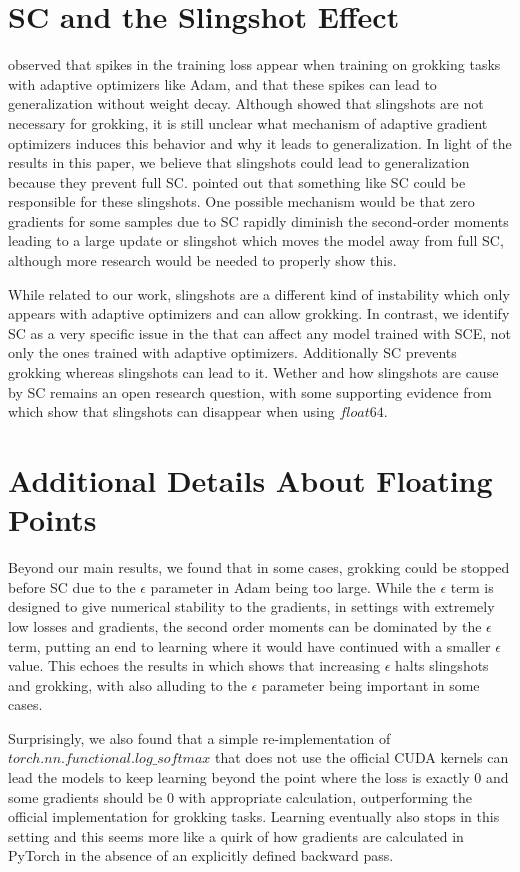 \section{SC and the Slingshot Effect}\label{app:slingshots}
\cite{slingshot-mechanism} observed that spikes in the training loss appear when training on grokking tasks with adaptive optimizers like Adam, and that these spikes can lead to generalization without weight decay. Although \cite{Nanda2023-hf} showed that slingshots are not necessary for grokking, it is still unclear what mechanism of adaptive gradient optimizers induces this behavior and why it leads to generalization. In light of the results in this paper, we believe that slingshots could lead to generalization because they prevent full SC. \cite{Nanda2023-hf} pointed out that something like SC could be responsible for these slingshots. One possible mechanism would be that zero gradients for some samples due to SC rapidly diminish the second-order moments leading to a large update or slingshot which moves the model away from full SC, although more research would be needed to properly show this.

While related to our work, slingshots are a different kind of instability which only appears with adaptive optimizers and can allow grokking. In contrast, we identify SC as a very specific issue in the \softmax that can affect any model trained with SCE, not only the ones trained with adaptive optimizers. Additionally SC prevents grokking whereas slingshots can lead to it. Wether and how slingshots are cause by SC remains an open research question, with some supporting evidence from \cite{Nanda2023-hf} which show that slingshots can disappear when using $float64$.

\section{Additional Details About Floating Points}
Beyond our main results, we found that in some cases, grokking could be stopped before SC due to the $\epsilon$ parameter in Adam being too large. While the $\epsilon$ term is designed to give numerical stability to the gradients, in settings with extremely low losses and gradients, the second order moments can be dominated by the $\epsilon$ term, putting an end to learning where it would have continued with a smaller $\epsilon$ value. This echoes the results in \cite{slingshot-mechanism} which shows that increasing $\epsilon$ halts slingshots and grokking, with \cite{Nanda2023-hf} also alluding to the $\epsilon$ parameter being important in some cases.  

Surprisingly, we also found that a simple re-implementation of $torch.nn.functional.log\_softmax$ that does not use the official CUDA kernels can lead the models to keep learning beyond the point where the loss is exactly 0 and some gradients should be 0 with appropriate calculation, outperforming the official implementation for grokking tasks. Learning eventually also stops in this setting and this seems more like a quirk of how gradients are calculated in PyTorch in the absence of an explicitly defined backward pass.


